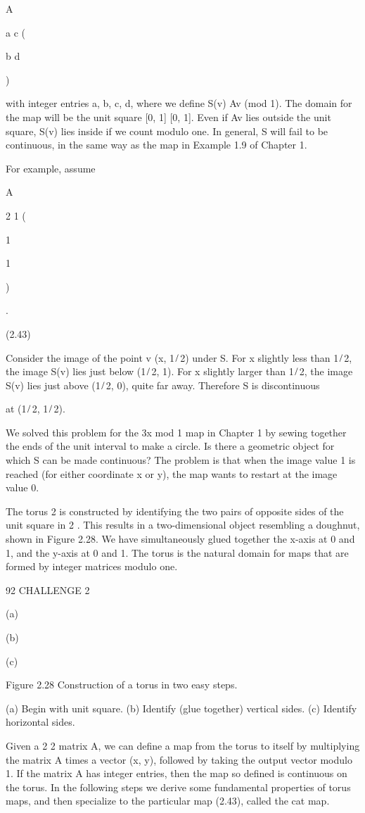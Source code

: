 \documentclass[12pt]{article}
\begin{document}
A

a c (

b d

)

with integer entries a, b, c, d, where we deﬁne S(v)  Av (mod 1). The domain for the map will be the unit square [0, 1] [0, 1]. Even 
if Av lies outside the unit square, S(v) lies inside if we count modulo one. In general, S will fail to be continuous, in the same 
way as the map in Example 1.9 of Chapter 1.

For example, assume

A

2 1 (

1

1

)

.

(2.43)

Consider the image of the point v  (x, 1 ̸ 2) under S. For x slightly less than 1 ̸ 2, the image S(v) lies just below (1 ̸ 2, 1). For x 
slightly larger than 1 ̸ 2, the image S(v) lies just above (1 ̸ 2, 0), quite far away. Therefore S is discontinuous

at (1 ̸ 2, 1 ̸ 2).

We solved this problem for the 3x mod 1 map in Chapter 1 by sewing together the ends of the unit interval to make a circle. Is there 
a geometric object for which S can be made continuous? The problem is that when the image value 1 is reached (for either coordinate x 
or y), the map wants to restart at the image value 0.

The torus  2 is constructed by identifying the two pairs of opposite sides of the unit square in  2 . This results in a 
two-dimensional object resembling a doughnut, shown in Figure 2.28. We have simultaneously glued together the x-axis at 0 and 1, and 
the y-axis at 0 and 1. The torus is the natural domain for maps that are formed by integer matrices modulo one.

92 CHALLENGE 2

(a)

(b)

(c)

Figure 2.28 Construction of a torus in two easy steps.

(a) Begin with unit square. (b) Identify (glue together) vertical sides. (c) Identify horizontal sides.

Given a 2 2 matrix A, we can deﬁne a map from the torus to itself by multiplying the matrix A times a vector (x, y), followed by 
taking the output vector modulo 1. If the matrix A has integer entries, then the map so deﬁned is continuous on the torus. In the 
following steps we derive some fundamental properties of torus maps, and then specialize to the particular map (2.43), called the cat 
map.
\end{document}
